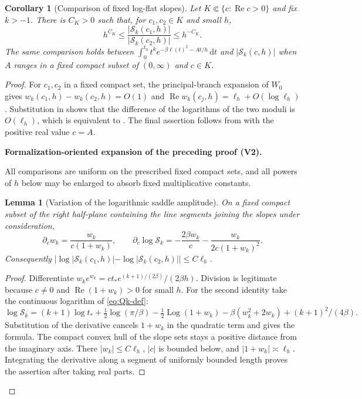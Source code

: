 \documentclass[11pt]{article}
\newtheorem{lemma}[theorem]{Lemma}
\newtheorem{corollary}[theorem]{Corollary}
\newcommand{\formalisationparentid}{X}
\newenvironment{formalisationaddition}[1]{\par\medskip\begingroup\color{blue}\def\formalisationparentid{#1}\setcounter{formalizationsublemma}{0}\let\lemma\formalizationsublemma\let\endlemma\endformalizationsublemma
  \def\Eo{\mathcal E_h^\circ}\def\EE{\mathcal E_h}\def\phio{\phi_h^\circ}\def\phih{\phi_h}\def\Ho{H_h^{\rm atom}(v^\circ)}\def\Ha{H_h^{\rm atom}}\def\HL{H_h^{L}}\def\Dh{D_h}\def\Log{\operatorname{Log}}\def\ellh{\ell_h}\def\Gp{G_{p,h}}\def\Ast{A_{*,h}}\def\ahat{\widehat{\mathfrak a}_h}\def\ah{\mathfrak a_h}\def\rh{\widehat\rho_h}\def\deltah{\widehat\delta_h}\def\oldref##1{\textup{(##1)}}\def\interface##1{\par\noindent\textit{Analytical interface used here.} ##1\par}\def\finish{\par\noindent\textit{Conclusion of the formalization-oriented expansion.} }\par\noindent\textbf{Formalization-oriented expansion of the preceding proof (V2).}\par\smallskip
}{\par\endgroup\medskip
}
\newcommand{\dd}{\,\mathrm d}
\newcommand{\Rea}{\operatorname{Re}}
\begin{document}
\begin{corollary}[Comparison of fixed log-flat slopes]
\label{cor:log-flat-slope-comparison}
Let $K\Subset\{c:\Rea c>0\}$ and fix $k>-1$.  There is $C_K>0$ such that,
for $c_1,c_2\in K$ and small $h$,
\begin{equation}\label{eq:Q-slope-comparison}
 h^{C_K}
 \le\frac{|\mathcal S_k(c_1,h)|}{|\mathcal S_k(c_2,h)|}
 \le h^{-C_K}.
\end{equation}
The same comparison holds between
$\int_0^{t_0}t^ke^{-\beta\ell(t)^2-At/h}\dd t$ and
$|\mathcal S_k(c,h)|$ when $A$ ranges in a fixed compact subset of
$(0,\infty)$ and $c\in K$.
\end{corollary}

\begin{proof}
For $c_1,c_2$ in a fixed compact set, the principal-branch expansion of
$W_0$ gives $w_k(c_1,h)-w_k(c_2,h)=O(1)$ and
$\Rea w_k(c_j,h)=\ell_h+O(\log\ell_h)$.  Substitution in
 shows that the difference of the logarithms of the two
moduli is $O(\ell_h)$, which is equivalent to
.  The final assertion follows from
 with the positive real value
$c=A$.

\begin{formalisationaddition}{C6.5}
All comparisons are uniform on the prescribed fixed compact sets, and all powers of $h$ below may be enlarged to absorb fixed multiplicative constants.

\begin{lemma}[Variation of the logarithmic saddle amplitude]\label{sublemma:C6-5-log-derivative}
On a fixed compact subset of the right half-plane containing the line segments joining the slopes under consideration,
\[
 \partial_c w_k=\frac{w_k}{c(1+w_k)},\qquad
 \partial_c\log \mathcal S_k=-\frac{2\beta w_k}{c}
       -\frac{w_k}{2c(1+w_k)^2}.
\]
Consequently $|\log|\mathcal S_k(c_1,h)|-\log|\mathcal S_k(c_2,h)||\le C\ellh$.
\end{lemma}
\begin{proof}
Differentiate $w_ke^{w_k}=ct_*e^{(k+1)/(2\beta)}/(2\beta h)$. Division is legitimate because $c\ne0$ and $\Rea(1+w_k)>0$ for small $h$. For the second identity take the continuous logarithm of \eqref{eq:Qk-def}:
\[
 \log \mathcal S_k=(k+1)\log t_*+\tfrac12\log(\pi/\beta)
 -\tfrac12\Log(1+w_k)-\beta(w_k^2+2w_k)+(k+1)^2/(4\beta).
\]
Substitution of the derivative cancels $1+w_k$ in the quadratic term and gives the formula. The compact convex hull of the slope sets stays a positive distance from the imaginary axis. There $|w_k|\le C\ellh$, $|c|$ is bounded below, and $|1+w_k|\asymp\ellh$. Integrating the derivative along a segment of uniformly bounded length proves the assertion after taking real parts.
\end{proof}


\end{formalisationaddition}
\end{proof}
\end{document}
